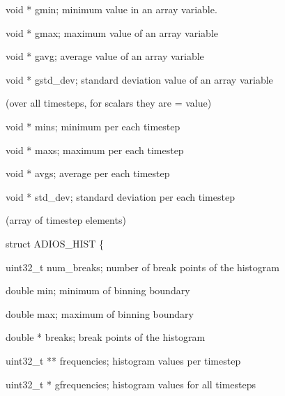 \vspace{22pt}
void      * gmin;  minimum value in an array variable. 

\vspace{10pt}
void      * gmax;  maximum value of an array variable 

\vspace{10pt}
void      *      gavg; average value of an array variable

\vspace{10pt}
void      *      gstd\_dev; standard deviation value of an array variable

\vspace{10pt}
\parindent=36pt
(over all timesteps, for scalars they are = value)

\vspace{22pt}
\parindent=0pt
void      * mins; minimum per each timestep 

\vspace{10pt}
void      * maxs;  maximum per each timestep

\vspace{10pt}
void      * avgs;  average per each timestep

\vspace{10pt}
void      * std\_dev;  standard deviation per each timestep

\vspace{10pt}
\parindent=36pt
(array of timestep elements)

\vspace{22pt}
\parindent=0pt
struct ADIOS\_HIST \{

\vspace{10pt}
\parindent=3pt
uint32\_t      num\_breaks;  number of break points of the histogram

\vspace{10pt}
\parindent=7pt
double   min; minimum of binning boundary 

\vspace{10pt}
double   max;  maximum of binning boundary 

\vspace{10pt}
\parindent=14pt
double    *   breaks;        break points of the histogram

\vspace{10pt}
\parindent=7pt
uint32\_t  ** frequencies; histogram values per timestep

\vspace{10pt}
uint32\_t  *   gfrequencies;  histogram values for all timesteps


